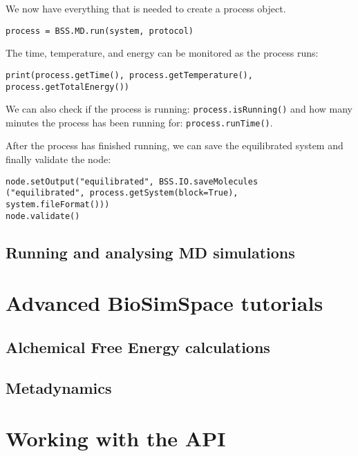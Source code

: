 \documentclass[9pt,tutorial]{livecoms}
\begin{document}
We now have everything that is needed to create a process object.
\begin{verbatim}
process = BSS.MD.run(system, protocol)
\end{verbatim}

The time, temperature, and energy can be monitored as the process runs: 
\begin{verbatim}
print(process.getTime(), process.getTemperature(),
process.getTotalEnergy())
\end{verbatim}
We can also check if the process is running: \texttt{process.isRunning()} and  how many minutes the process has been running for: \texttt{process.runTime()}.

After the process has finished running, we can save the equilibrated system and finally validate the node: 
\begin{verbatim}
node.setOutput("equilibrated", BSS.IO.saveMolecules
("equilibrated", process.getSystem(block=True),
system.fileFormat()))
node.validate()
\end{verbatim}

\subsection{Running and analysing MD simulations}
\label{subsec:running_MD}

\section{Advanced BioSimSpace tutorials}
\label{sec:advanced_tutorial}

\subsection{Alchemical Free Energy calculations}

\subsection{Metadynamics}

\section{Working with the API}
\label{sec:API_tutorial}
\end{document}
